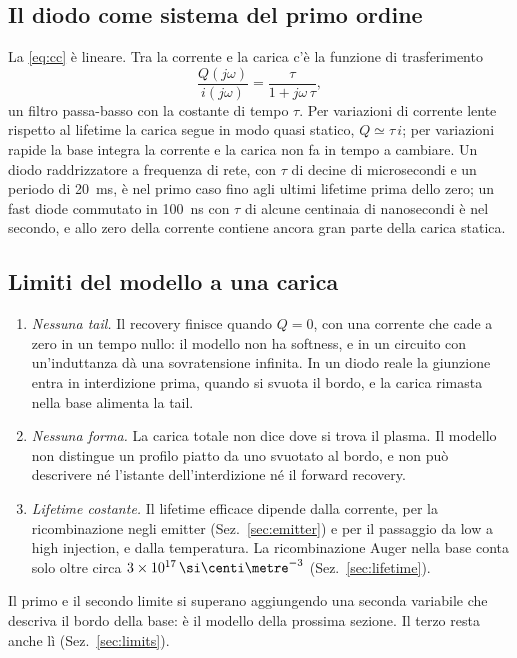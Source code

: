 \documentclass[10pt,a4paper]{scrartcl}
\let\newcommand\pdvaluedefine
\newcommand{\cmc}{\si{\centi\metre^{-3}}}
\begin{document}
\subsection{Il diodo come sistema del primo ordine}
\label{sec:ccsystem}
La \eqref{eq:cc} è lineare. Tra la corrente e la carica c'è la funzione di trasferimento
\begin{equation}
\frac{Q(j\omega)}{i(j\omega)} = \frac{\tau}{1 + j\omega\,\tau} ,
\label{eq:cctf}
\end{equation}
un filtro passa-basso con la costante di tempo $\tau$. Per variazioni di corrente lente rispetto al lifetime la carica segue in modo quasi statico, $Q \simeq \tau\,i$; per variazioni rapide la base integra la corrente e la carica non fa in tempo a cambiare. Un diodo raddrizzatore a frequenza di rete, con $\tau$ di decine di microsecondi e un periodo di \SI{20}{\milli\second}, è nel primo caso fino agli ultimi lifetime prima dello zero; un fast diode commutato in \SI{100}{\nano\second} con $\tau$ di alcune centinaia di nanosecondi è nel secondo, e allo zero della corrente contiene ancora gran parte della carica statica.

\subsection{Limiti del modello a una carica}
\label{sec:cclimits}
\begin{enumerate}
\item \emph{Nessuna tail.} Il recovery finisce quando $Q = 0$, con una corrente che cade a zero in un tempo nullo: il modello non ha softness, e in un circuito con un'induttanza dà una sovratensione infinita. In un diodo reale la giunzione entra in interdizione prima, quando si svuota il bordo, e la carica rimasta nella base alimenta la tail.
\item \emph{Nessuna forma.} La carica totale non dice dove si trova il plasma. Il modello non distingue un profilo piatto da uno svuotato al bordo, e non può descrivere né l'istante dell'interdizione né il forward recovery.
\item \emph{Lifetime costante.} Il lifetime efficace dipende dalla corrente, per la ricombinazione negli emitter (Sez.~\ref{sec:emitter}) e per il passaggio da low a high injection, e dalla temperatura. La ricombinazione Auger nella base conta solo oltre circa $3\times10^{17}\,\cmc$ (Sez.~\ref{sec:lifetime}).
\end{enumerate}
Il primo e il secondo limite si superano aggiungendo una seconda variabile che descriva il bordo della base: è il modello della prossima sezione. Il terzo resta anche lì (Sez.~\ref{sec:limits}).
\end{document}
